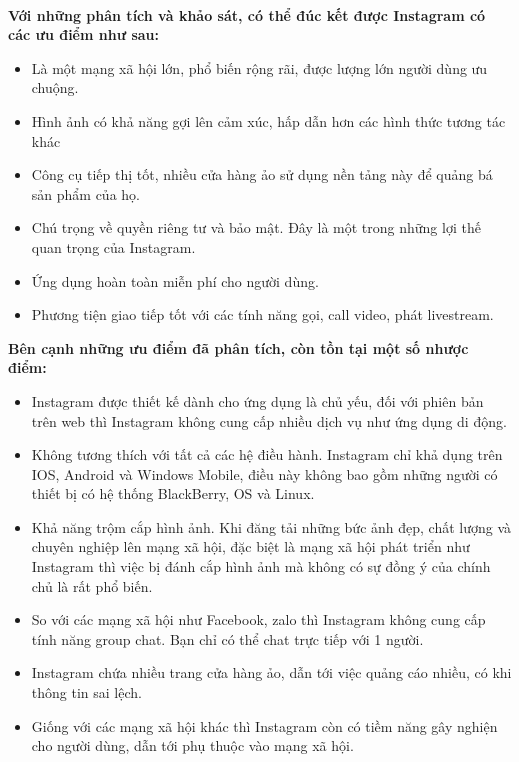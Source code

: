 \\ \par
\newline
\textbf{Với những phân tích và khảo sát, có thể đúc kết được Instagram có các ưu điểm như sau:}
\begin{itemize}
    \item Là một mạng xã hội lớn, phổ biến rộng rãi, được lượng lớn người dùng ưu chuộng.
    \item Hình ảnh có khả năng gợi lên cảm xúc, hấp dẫn hơn các hình thức tương tác khác
    \item Công cụ tiếp thị tốt, nhiều cửa hàng ảo sử dụng nền tảng này để quảng bá sản phẩm của họ.
    \item Chú trọng về quyền riêng tư và bảo mật. Đây là một trong những lợi thế quan trọng của Instagram.
    \item Ứng dụng hoàn toàn miễn phí cho người dùng.
    \item Phương tiện giao tiếp tốt với các tính năng gọi, call video, phát livestream.
\end{itemize}
\textbf{Bên cạnh những ưu điểm đã phân tích, còn tồn tại một số nhược điểm:}
\begin{itemize}
    \item Instagram được thiết kế dành cho ứng dụng là chủ yếu, đối với phiên bản trên web thì Instagram không cung cấp nhiều dịch vụ như ứng dụng di động.
    \item Không tương thích với tất cả các hệ điều hành. Instagram chỉ khả dụng trên IOS, Android và Windows Mobile, điều này không bao gồm những người có thiết bị có hệ thống BlackBerry, OS và Linux.
    \item Khả năng trộm cắp hình ảnh. Khi đăng tải những  bức ảnh đẹp, chất lượng và chuyên nghiệp lên mạng xã hội, đặc biệt là mạng xã hội phát triển như Instagram thì việc bị đánh cắp hình ảnh mà không có sự đồng ý của chính chủ là rất phổ biến. 
    \item So với các mạng xã hội như Facebook, zalo thì Instagram không cung cấp tính năng group chat. Bạn chỉ có thể chat trực tiếp với 1 người.
    \item Instagram chứa nhiều trang cửa hàng ảo, dẫn tới việc quảng cáo nhiều, có khi thông tin sai lệch.
    \item Giống với các mạng xã hội khác thì Instagram còn có tiềm năng gây nghiện cho người dùng, dẫn tới phụ thuộc vào mạng xã hội.
\end{itemize}